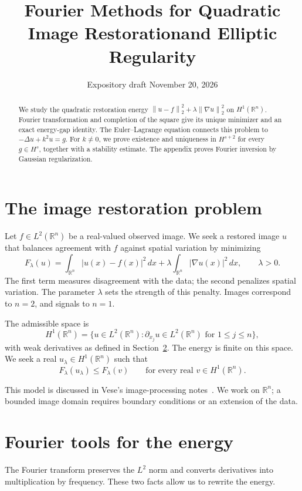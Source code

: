 \documentclass[11pt]{article}
\title{Fourier Methods for Quadratic Image Restoration\newline and Elliptic Regularity}
\author{}
\date{Expository draft \quad November 20, 2026}
\numberwithin{equation}{section}
\theoremstyle{definition}
\theoremstyle{remark}
\newcommand{\R}{\mathbb R}
\newcommand{\dd}{\,d}
\newcommand{\norm}[1]{\left\|#1\right\|}
\begin{document}
\maketitle
\vspace{-0.6cm}
\begin{abstract}
We study the quadratic restoration energy \(\norm{u-f}_2^2+\lambda\norm{\nabla u}_2^2\) on \(H^1(\R^n)\). Fourier transformation and completion of the square give its unique minimizer and an exact energy-gap identity. The Euler--Lagrange equation connects this problem to \(-\Delta u+k^2u=g\). For \(k\ne0\), we prove existence and uniqueness in \(H^{s+2}\) for every \(g\in H^s\), together with a stability estimate. The appendix proves Fourier inversion by Gaussian regularization.
\end{abstract}
\setcounter{tocdepth}{1}
\tableofcontents
\clearpage

\section{The image restoration problem}\label{sec:problem}
Let \(f\in L^2(\R^n)\) be a real-valued observed image. We seek a restored image \(u\) that balances agreement with \(f\) against spatial variation by minimizing
\begin{equation}\label{eq:energy}
 F_\lambda(u)=\int_{\R^n}|u(x)-f(x)|^2\dd x
       +\lambda\int_{\R^n}|\nabla u(x)|^2\dd x,
       \qquad \lambda>0.
\end{equation}
The first term measures disagreement with the data; the second penalizes spatial variation. The parameter \(\lambda\) sets the strength of this penalty. Images correspond to \(n=2\), and signals to \(n=1\).

The admissible space is
\[
 H^1(\R^n)=\{u\in L^2(\R^n):\partial_{x_j}u\in L^2(\R^n)
                    \text{ for }1\le j\le n\},
\]
with weak derivatives as defined in Section~\ref{sec:tools}. The energy is finite on this space. We seek a real \(u_\lambda\in H^1(\R^n)\) such that
\begin{equation}\label{eq:minproblem}
 F_\lambda(u_\lambda)\le F_\lambda(v)
       \qquad\text{for every real }v\in H^1(\R^n).
\end{equation}

This model is discussed in Vese's image-processing notes~\cite{pcmi}. We work on \(\R^n\); a bounded image domain requires boundary conditions or an extension of the data.

\section{Fourier tools for the energy}\label{sec:tools}
The Fourier transform preserves the \(L^2\) norm and converts derivatives into multiplication by frequency. These two facts allow us to rewrite the energy.
\end{document}
